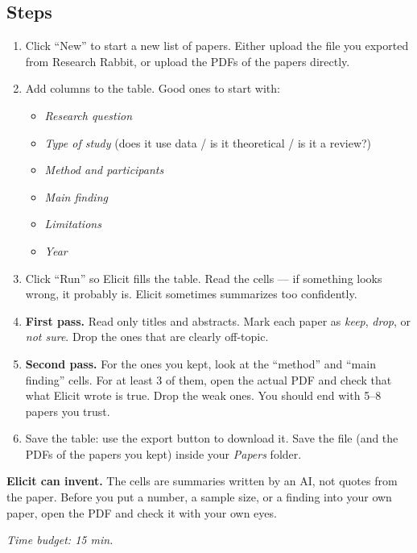\documentclass[11pt,a4paper]{article}
\begin{document}
\subsection*{Steps}
\begin{enumerate}[leftmargin=*, itemsep=2pt]
  \item Click ``New'' to start a new list of papers. Either upload the file you exported from Research Rabbit, or upload the PDFs of the papers directly.
  \item Add columns to the table. Good ones to start with:
    \begin{itemize}[leftmargin=1.4em, itemsep=1pt]
      \item \emph{Research question}
      \item \emph{Type of study} (does it use data / is it theoretical / is it a review?)
      \item \emph{Method and participants}
      \item \emph{Main finding}
      \item \emph{Limitations}
      \item \emph{Year}
    \end{itemize}
  \item Click ``Run'' so Elicit fills the table. Read the cells --- if something looks wrong, it probably is. Elicit sometimes summarizes too confidently.
  \item \textbf{First pass.} Read only titles and abstracts. Mark each paper as \emph{keep}, \emph{drop}, or \emph{not sure}. Drop the ones that are clearly off-topic.
  \item \textbf{Second pass.} For the ones you kept, look at the ``method'' and ``main finding'' cells. For at least 3 of them, open the actual PDF and check that what Elicit wrote is true. Drop the weak ones. You should end with 5--8 papers you trust.
  \item Save the table: use the export button to download it. Save the file (and the PDFs of the papers you kept) inside your \emph{Papers} folder.
\end{enumerate}

\begin{watchout}
\textbf{Elicit can invent.} The cells are summaries written by an AI, not quotes from the paper. Before you put a number, a sample size, or a finding into your own paper, open the PDF and check it with your own eyes.
\end{watchout}

\textit{Time budget: 15 min.}
\end{document}
